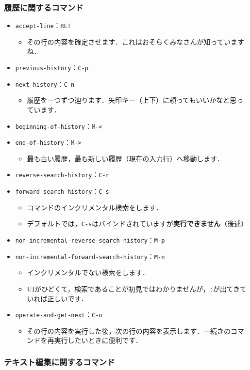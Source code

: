 \subsubsection{履歴に関するコマンド}
\begin{itemize}
\item \texttt{accept-line}：\texttt{RET}
  \begin{itemize}
  \item その行の内容を確定させます．これはおそらくみなさんが知っていますね．
  \end{itemize}
\item \texttt{previous-history}：\texttt{C-p}
\item \texttt{next-history}：\texttt{C-n}
  \begin{itemize}
  \item 履歴を一つずつ辿ります．矢印キー（上下）に頼ってもいいかなと思っています．
  \end{itemize}
\item \texttt{beginning-of-history}：\texttt{M-<}
\item \texttt{end-of-history}：\texttt{M->}
  \begin{itemize}
  \item 最も古い履歴，最も新しい履歴（現在の入力行）へ移動します．
  \end{itemize}
\item \texttt{reverse-search-history}：\texttt{C-r}
\item \texttt{forward-search-history}：\texttt{C-s}
  \begin{itemize}
  \item コマンドのインクリメンタル検索をします．
  \item デフォルトでは，\texttt{C-s}はバインドされていますが\textbf{実行できません}（後述）
  \end{itemize}
\item \texttt{non-incremental-reverse-search-history}：\texttt{M-p}
\item \texttt{non-incremental-forward-search-history}：\texttt{M-n}
  \begin{itemize}
  \item インクリメンタルでない検索をします．
  \item UIがひどくて，検索であることが初見ではわかりませんが，\texttt{:}が出てきていれば正しいです．
  \end{itemize}
\item \texttt{operate-and-get-next}：\texttt{C-o}
  \begin{itemize}
  \item その行の内容を実行した後，次の行の内容を表示します．一続きのコマンドを再実行したいときに便利です．
  \end{itemize}
\end{itemize}
\subsubsection{テキスト編集に関するコマンド}
